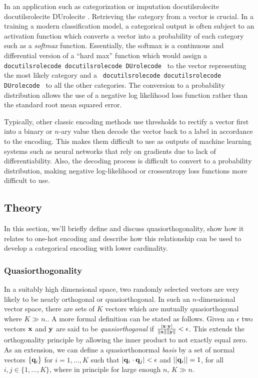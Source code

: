 \documentclass[]{article}
\providecommand*{\DUrole}[2]{%
  \ifcsname docutilsrole#1\endcsname%
    \csname docutilsrole#1\endcsname{#2}%
  \else
    \csname DUrole#1\endcsname{#2}%
  \fi%
}
\begin{document}
In an application such as categorization or imputation \DUrole{cite}{gondara}. Retrieving the category from a vector is crucial. In a training a modern classification model, a categorical output is often subject to an activation function which converts a vector into a probability of each category such as a \emph{softmax} function. Essentially, the softmax is a continuous and differential version of a ``hard max'' function which would assign a \texttt{\DUrole{code}{1}} to the vector representing the most likely category and a \texttt{\DUrole{code}{0}} to all the other categories. The conversion to a probability distribution allows the use of a negative log likelihood loss function rather than the standard root mean squared error.

Typically, other classic encoding methods use thresholds to rectify a vector first into a binary or $n$-ary value then decode the vector back to a label in accordance to the encoding. This makes them difficult to use as outputs of machine learning systems such as neural networks that rely on gradients due to lack of differentiability. Also, the decoding process is difficult to convert to a probability distribution, making negative log-likelihood or crossentropy loss functions more difficult to use.

\subsection{Theory%
  \label{theory}%
}


In this section, we'll briefly define and discuss quasiorthogonality, show how it relates to one-hot encoding and describe how this relationship can be used to develop a categorical encoding with lower cardinality.

\subsubsection{Quasiorthogonality%
  \label{quasiorthogonality}%
}


In a suitably high dimensional space, two randomly selected vectors are very likely to be nearly orthogonal or quasiorthogonal. In such an $n$-dimensional vector space, there are sets of $K$ vectors which are mutually quasiorthogonal where $K\gg n.$. A more formal definition can be stated as follows.
Given an $\epsilon$ two vectors ${\bf x}$ and
${\bf y}$ are said to be \emph{quasiorthogonal} if
$\frac{|{\bf x}\cdot {\bf y}|}{\|{\bf x}\| \|{\bf y}\|}<\epsilon$.
This extends the orthogonality principle by allowing the inner product
to not exactly equal zero. As an extension, we can define a
quasiorthonormal \emph{basis} by a set of normal vectors
$\{{\bf q}_i\}$ for $i=1,\ldots,K$ such that
$|{\bf q}_i\cdot {\bf q}_j| < \epsilon$ and
$||{\bf q}_i||=1$, for all $i,j\in\{1,\ldots,K\}$, where in
principle for large enough $n$, $K\gg n$.
\end{document}
